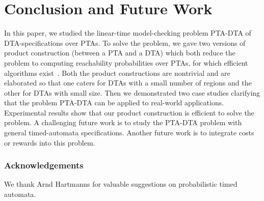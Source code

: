 
\vspace{-1em}
\section{Conclusion and Future Work}
\vspace{-1em}

In this paper, we studied the linear-time model-checking problem {\sc PTA-DTA} of DTA-specifications over PTAs.
To solve the problem, we gave two versions of product construction (between a PTA and a DTA) which both reduce the problem to computing reachability probabilities over PTAs, for which efficient algorithms exist~\cite{DBLP:journals/fmsd/NormanPS13,DBLP:journals/tcs/KwiatkowskaNSS02}.
Both the product constructions are nontrivial and are elaborated so that one caters for DTAs with a small number of regions and the other for DTAs with small size.
Then we demonstrated two case studies clarifying that the problem PTA-DTA can be applied to real-world applications.
Experimental results show that our product construction is efficient to solve the problem.
A challenging future work is to study the PTA-DTA problem with general timed-automata specifications.
Another future work is to integrate costs or rewards into this problem.

\vspace{-1em}
\subsubsection*{Acknowledgements} We thank Arnd Hartmanns for valuable suggestions on probabilistic timed automata.
